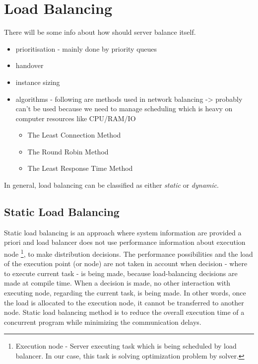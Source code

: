 
\section{Load Balancing}\label{sec:load-balancing}
There will be some info about how should server balance itself.
\begin{itemize}
    \item prioritisation - mainly done by priority queues
    \item handover
    \item instance sizing
    \item algorithms - following are methods used in network balancing -> probably can't be used because we need to manage scheduling
    which is heavy on computer resources like CPU/RAM/IO
    \begin{itemize}
        \item The Least Connection Method
        \item The Round Robin Method
        \item The Least Response Time Method
    \end{itemize}
\end{itemize}

In general, load balancing can be classified as either \textit{static} or \textit{dynamic}.

\subsection{Static Load Balancing}\label{subsec:static-load-balancing}
Static load balancing is an approach where system information are provided a priori
and load balancer does not use performance information about execution node
\footnote{Execution node - Server executing task which is being scheduled by load balancer.
In our case, this task is solving optimization problem by solver.},
to make distribution decisions.
The performance possibilities and the load of the execution point (or node) are not taken in account
when decision - where to execute current task - is being made, because load-balancing decisions are made at compile time.
When a decision is made, no other interaction with executing node, regarding the current task, is being made.
In other words, once the load is allocated to the execution node, it cannot be transferred to another node.
Static load balancing method is to reduce the overall execution time of a concurrent program while minimizing the communication delays.\cite{web:loadBalancingInGridComputing}

